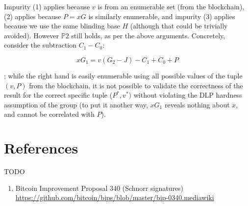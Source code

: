 \documentclass[10pt,a4paper]{article}
\providecommand{\tightlist}{%
  \setlength{\itemsep}{0pt}\setlength{\parskip}{0pt}}
\begin{document}
Impurity (1) applies because $v$ is from an enumerable set (from the blockchain), (2) applies because $P=xG$ is similarly enumerable, and impurity (3) applies because we use the same blinding base $H$ (although that could be trivially avoided). However $\mathbb{P}2$ still holds, as per the above arguments. Concretely, consider the subtraction $C_1 - C_0$:

$$xG_1  = v(G_2 -J) -C_1 + C_0 + P$$

; while the right hand is easily enumerable using all possible values of the tuple $(v, P)$ from the blockchain, it is not possible to validate the correctness of the result for the correct specific tuple ($P^*, v^*)$ without violating the DLP hardness assumption of the group (to put it another way, $xG_1$ reveals nothing about $x$, and cannot be correlated with $P$).




\hypertarget{references}{%
\section[References]{\texorpdfstring{\protect\hypertarget{anchor-77}{}{}References}{References}}\label{references}}

TODO

\begin{enumerate}
\def\labelenumi{\arabic{enumi}.}
\tightlist
\item
  \protect\hypertarget{anchor-4}{}{}Bitcoin Improvement Proposal 340 (Schnorr signatures)
  \url{https://github.com/bitcoin/bips/blob/master/bip-0340.mediawiki}
\end{enumerate}
\end{document}
